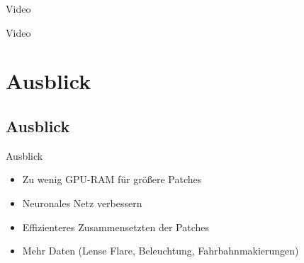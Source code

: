 \begin{frame}{Video}

      Video

\end{frame}

\section{Ausblick}
\subsection{Ausblick}
\begin{frame}{Ausblick}
    \begin{itemize}
        \item Zu wenig GPU-RAM f\"ur gr\"o\ss ere Patches
        \item Neuronales Netz verbessern
        \item Effizienteres Zusammensetzten der Patches
        \item Mehr Daten (Lense Flare, Beleuchtung, Fahrbahnmakierungen)
    \end{itemize}

\end{frame}